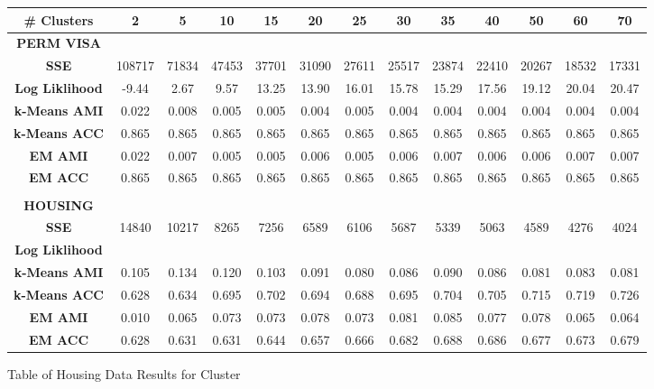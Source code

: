\documentclass[h]{article}
\begin{document}
\begin{figure}[H] 
\begin{tabular}{ | c | c  | c | c | c | c | c | c| c| c| c| c| c | } 
\hline
\textbf{ # Clusters } & \textbf{2} & \textbf{5} & \textbf{10} & \textbf{15} & \textbf{20} & \textbf{25} & \textbf{30} & \textbf{35} & \textbf{40} & \textbf{50} & \textbf{60} & \textbf{70}   \\
\hline
\textbf{PERM VISA} \\ \hline
\textbf{SSE} &  108717 & 71834 & 47453 & 37701 & 31090 & 27611 & 25517 & 23874 & 22410 & 20267 & 18532 & 17331 \\ \hline
\textbf{Log Liklihood} & -9.44 & 2.67 & 9.57 & 13.25 & 13.90 & 16.01 & 15.78 & 15.29 & 17.56 & 19.12 & 20.04 & 20.47 \\ \hline
\textbf{k-Means AMI} & 0.022 & 0.008 & 0.005 & 0.005 & 0.004 & 0.005 & 0.004 & 0.004 & 0.004 & 0.004 & 0.004 & 0.004 \\ \hline
\textbf{k-Means ACC} & 0.865 & 0.865 & 0.865 & 0.865 & 0.865 & 0.865 & 0.865 & 0.865 & 0.865 & 0.865 & 0.865 & 0.865 \\ \hline
\textbf{EM AMI} & 0.022 & 0.007 & 0.005 & 0.005 & 0.006 & 0.005 & 0.006 & 0.007 & 0.006 & 0.006 & 0.007 & 0.007 \\ \hline
\textbf{EM ACC} & 0.865 & 0.865 & 0.865 & 0.865 & 0.865 & 0.865 & 0.865 & 0.865 & 0.865 & 0.865 & 0.865 & 0.865 \\ \hline
\\
\textbf{HOUSING} \\ \hline
\textbf{SSE} & 14840 & 10217 & 8265 & 7256 & 6589 & 6106 & 5687 & 5339 & 5063 & 4589 & 4276 & 4024 \\ \hline
\textbf{Log Liklihood} & \\ \hline
\textbf{k-Means AMI} & 0.105 & 0.134 & 0.120 & 0.103 & 0.091 & 0.080 & 0.086 & 0.090 & 0.086 & 0.081 & 0.083 & 0.081 \\ \hline
\textbf{k-Means ACC} & 0.628 & 0.634 & 0.695 & 0.702 & 0.694 & 0.688 & 0.695 & 0.704 & 0.705 & 0.715 & 0.719 & 0.726 \\ \hline
\textbf{EM AMI} & 0.010 & 0.065 & 0.073 & 0.073 & 0.078 & 0.073 & 0.081 & 0.085 & 0.077 & 0.078 & 0.065 & 0.064 \\ \hline
\textbf{EM ACC} & 0.628 & 0.631 & 0.631 & 0.644 & 0.657 & 0.666 & 0.682 & 0.688 & 0.686 & 0.677 & 0.673 & 0.679 \\ \hline
\end{tabular}
\caption*{Table of Housing Data Results for Cluster } 
\end{figure}
\end{document}
